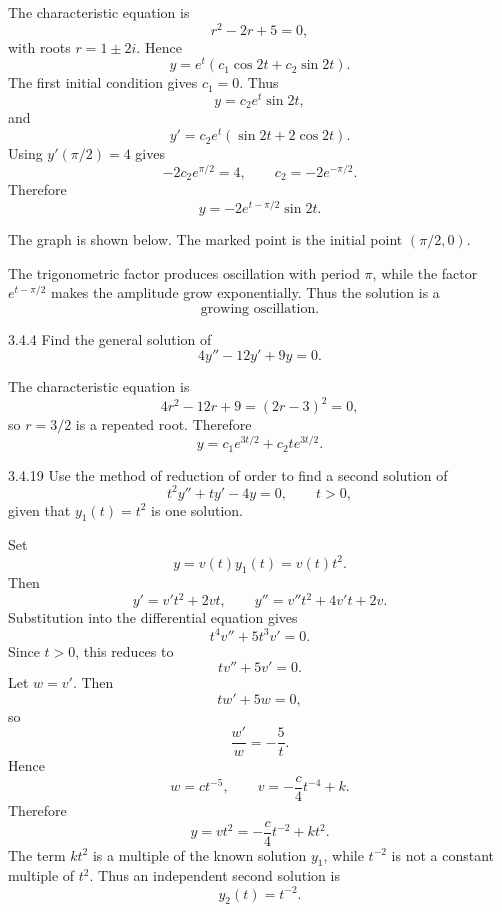\documentclass[11pt,oneside]{article}
\begin{document}
\begin{solution}
The characteristic equation is
\[
    r^2-2r+5=0,
\]
with roots $r=1\pm2i$. Hence
\[
    y=e^t(c_1\cos2t+c_2\sin2t).
\]
The first initial condition gives $c_1=0$. Thus
\[
    y=c_2e^t\sin2t,
\]
and
\[
    y'=c_2e^t(\sin2t+2\cos2t).
\]
Using $y'(\pi/2)=4$ gives
\[
    -2c_2e^{\pi/2}=4,
    \qquad
    c_2=-2e^{-\pi/2}.
\]
Therefore
\[
    \boxed{y=-2e^{t-\pi/2}\sin2t}.
\]

The graph is shown below. The marked point is the initial point $(\pi/2,0)$.

\begin{center}
\end{center}

The trigonometric factor produces oscillation with period $\pi$, while the factor $e^{t-\pi/2}$ makes the amplitude grow exponentially. Thus the solution is a
\[
    \boxed{\text{growing oscillation}}.
\]
\end{solution}

\begin{problem}{3.4.4}
Find the general solution of
\[
    4y''-12y'+9y=0.
\]
\end{problem}

\begin{solution}
The characteristic equation is
\[
    4r^2-12r+9=(2r-3)^2=0,
\]
so $r=3/2$ is a repeated root. Therefore
\[
    \boxed{y=c_1e^{3t/2}+c_2te^{3t/2}}.
\]
\end{solution}

\begin{problem}{3.4.19}
Use the method of reduction of order to find a second solution of
\[
    t^2y''+ty'-4y=0,
    \qquad
    t>0,
\]
given that $y_1(t)=t^2$ is one solution.
\end{problem}

\begin{solution}
Set
\[
    y=v(t)y_1(t)=v(t)t^2.
\]
Then
\[
    y'=v't^2+2vt,
    \qquad
    y''=v''t^2+4v't+2v.
\]
Substitution into the differential equation gives
\[
    t^4v''+5t^3v'=0.
\]
Since $t>0$, this reduces to
\[
    tv''+5v'=0.
\]
Let $w=v'$. Then
\[
    tw'+5w=0,
\]
so
\[
    \frac{w'}{w}=-\frac5t.
\]
Hence
\[
    w=ct^{-5},
    \qquad
    v=-\frac{c}{4}t^{-4}+k.
\]
Therefore
\[
    y=vt^2=-\frac{c}{4}t^{-2}+kt^2.
\]
The term $kt^2$ is a multiple of the known solution $y_1$, while $t^{-2}$ is not a constant multiple of $t^2$. Thus an independent second solution is
\[
    \boxed{y_2(t)=t^{-2}}.
\]
\end{solution}
\end{document}
